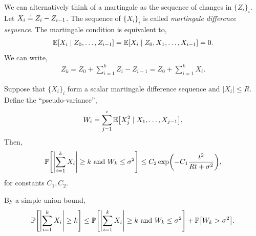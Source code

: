 We can alternatively think of a martingale as the sequence of changes in $\{Z_i\}_i$. Let $X_i \overset{.}{=} Z_i - Z_{i-1}$. The sequence of $\{X_i\}_i$ is called \emph{martingale difference sequence}. The martingale condition is equivalent to, \begin{align}
    \E{X_i \mid Z_0, \dots, Z_{i-1}} = \E{X_i \mid Z_0, X_1, \dots, X_{i-1}} = 0.
\end{align} We can write, \begin{align}
    Z_k = Z_0 + \sum_{i=1}^k Z_i - Z_{i-1} = Z_0 + \sum_{i=1}^k X_i.
\end{align}

\begin{thm}
    Suppose that $\{X_i\}_i$ form a scalar martingale difference sequence and $|X_i| \leq R$. Define the ``pseudo-variance'', \begin{align}
        W_i \defeq \sum_{j=1}^i \E{X_j^2 \mid X_1, \dots, X_{j-1}},
    \end{align} Then, \begin{align}
        \Pr{\abs{\sum_{i=1}^k X_i} \geq k \text{ and } W_k \leq \sigma^2} \leq C_2 \exp\parentheses*{-C_1 \frac{t^2}{Rt + \sigma^2}},
    \end{align} for constants $C_1, C_2$.
\end{thm}\noindent By a simple union bound, \begin{align}
    \Pr{\abs{\sum_{i=1}^k X_i} \geq k} \leq \Pr{\abs{\sum_{i=1}^k X_i} \geq k \text{ and } W_k \leq \sigma^2} + \Pr{W_k > \sigma^2}.
\end{align}